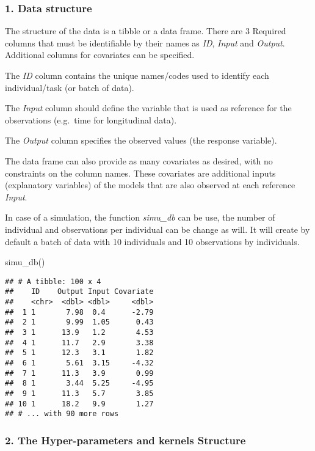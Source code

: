 \documentclass[
]{article}
\newenvironment{Shaded}{\begin{snugshade}}{\end{snugshade}}
\newcommand{\FunctionTok}[1]{\textcolor[rgb]{0.00,0.00,0.00}{#1}}
\newcommand{\NormalTok}[1]{#1}
\begin{document}
\hypertarget{data-structure}{%
\subsubsection{1. Data structure}\label{data-structure}}

The structure of the data is a tibble or a data frame. There are 3
Required columns that must be identifiable by their names as \emph{ID},
\emph{Input} and \emph{Output}. Additional columns for covariates can be
specified.

The \emph{ID} column contains the unique names/codes used to identify
each individual/task (or batch of data).

The \emph{Input} column should define the variable that is used as
reference for the observations (e.g.~time for longitudinal data).

The \emph{Output} column specifies the observed values (the response
variable).

The data frame can also provide as many covariates as desired, with no
constraints on the column names. These covariates are additional inputs
(explanatory variables) of the models that are also observed at each
reference \emph{Input}.

In case of a simulation, the function \emph{simu\_db} can be use, the
number of individual and observations per individual can be change as
will. It will create by default a batch of data with 10 individuals and
10 observations by individuals.

\begin{Shaded}
\begin{Highlighting}[]
\FunctionTok{simu\_db}\NormalTok{()}
\end{Highlighting}
\end{Shaded}

\begin{verbatim}
## # A tibble: 100 x 4
##    ID    Output Input Covariate
##    <chr>  <dbl> <dbl>     <dbl>
##  1 1       7.98  0.4      -2.79
##  2 1       9.99  1.05      0.43
##  3 1      13.9   1.2       4.53
##  4 1      11.7   2.9       3.38
##  5 1      12.3   3.1       1.82
##  6 1       5.61  3.15     -4.32
##  7 1      11.3   3.9       0.99
##  8 1       3.44  5.25     -4.95
##  9 1      11.3   5.7       3.85
## 10 1      18.2   9.9       1.27
## # ... with 90 more rows
\end{verbatim}

\hypertarget{the-hyper-parameters-and-kernels-structure}{%
\subsubsection{2. The Hyper-parameters and kernels
Structure}\label{the-hyper-parameters-and-kernels-structure}}
\end{document}
